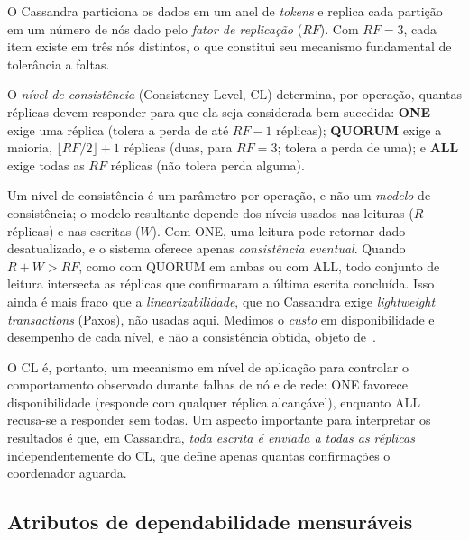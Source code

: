 \documentclass[runningheads]{llncs}
\begin{document}
O Cassandra particiona os dados em um anel de \emph{tokens} e replica cada
partição em um número de nós dado pelo \emph{fator de replicação} ($RF$). Com $RF=3$, cada item existe em três nós distintos, o que
constitui seu mecanismo fundamental de tolerância a faltas.

O \emph{nível de consistência} (Consistency Level, CL) determina, por operação,
quantas réplicas devem responder para que ela seja considerada bem-sucedida:
\textbf{ONE} exige uma réplica (tolera a perda de até $RF-1$ réplicas); \textbf{QUORUM} exige a maioria, $\lfloor RF/2 \rfloor + 1$
réplicas (duas, para $RF=3$; tolera a perda de uma); e \textbf{ALL} exige todas
as $RF$ réplicas (não tolera perda alguma).

Um nível de consistência é um parâmetro por operação, e não um \emph{modelo} de
consistência; o modelo resultante depende dos níveis usados nas leituras ($R$
réplicas) e nas escritas ($W$). Com ONE, uma leitura pode retornar dado
desatualizado, e o sistema oferece apenas \emph{consistência eventual}. Quando
$R+W>RF$, como com QUORUM em ambas ou com ALL, todo conjunto de leitura
intersecta as réplicas que confirmaram a última escrita concluída. Isso ainda é
mais fraco que a \emph{linearizabilidade}, que no Cassandra exige
\emph{lightweight transactions} (Paxos), não usadas aqui. Medimos o
\emph{custo} em disponibilidade e desempenho de cada nível, e não a consistência
obtida, objeto de~\cite{rahman2012,jepsen}.

O CL é, portanto, um mecanismo em nível de aplicação para controlar o
comportamento observado durante falhas de nó e de rede: ONE favorece
disponibilidade (responde com qualquer réplica alcançável), enquanto ALL
recusa-se a responder sem todas. Um aspecto importante para
interpretar os resultados é que, em Cassandra, \emph{toda escrita é enviada a
todas as réplicas} independentemente do CL, que define apenas quantas
confirmações o coordenador aguarda.

\subsection{Atributos de dependabilidade mensuráveis}
\end{document}
